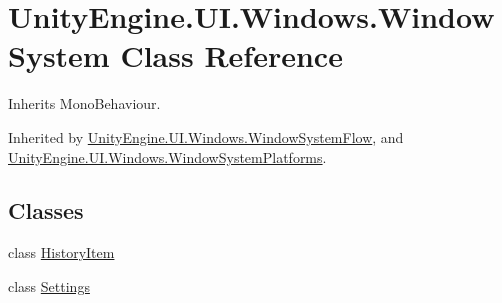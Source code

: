 \hypertarget{class_unity_engine_1_1_u_i_1_1_windows_1_1_window_system}{}\section{Unity\+Engine.\+U\+I.\+Windows.\+Window\+System Class Reference}
\label{class_unity_engine_1_1_u_i_1_1_windows_1_1_window_system}


Inherits Mono\+Behaviour.



Inherited by \hyperlink{class_unity_engine_1_1_u_i_1_1_windows_1_1_window_system_flow}{Unity\+Engine.\+U\+I.\+Windows.\+Window\+System\+Flow}, and \hyperlink{class_unity_engine_1_1_u_i_1_1_windows_1_1_window_system_platforms}{Unity\+Engine.\+U\+I.\+Windows.\+Window\+System\+Platforms}.

\subsection*{Classes}
\begin{DoxyCompactItemize}
\item 
class \hyperlink{class_unity_engine_1_1_u_i_1_1_windows_1_1_window_system_1_1_history_item}{History\+Item}
\item 
class \hyperlink{class_unity_engine_1_1_u_i_1_1_windows_1_1_window_system_1_1_settings}{Settings}
\end{DoxyCompactItemize}
